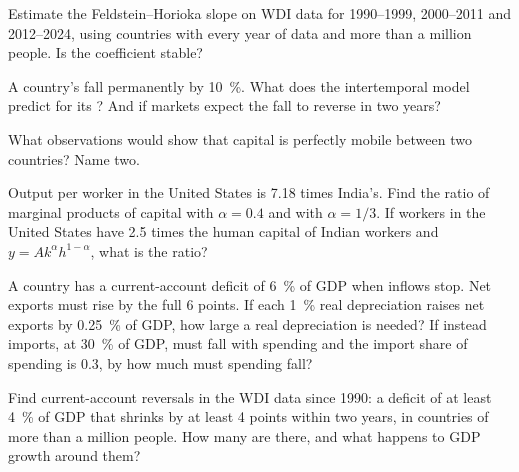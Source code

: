 \begin{exercise}[$\star\star$]\label{exo:b3:current-account:7}
Estimate the Feldstein--Horioka slope on WDI data for 1990--1999, 2000--2011 and
2012--2024, using countries with every year of data and more than a million people.
Is the coefficient stable?
\end{exercise}

\begin{exercise}[$\star\star$]\label{exo:b3:current-account:8}
A country's  fall permanently by 10~\%. What does the intertemporal
model predict for its ? And if markets expect the fall to reverse in
two years?
\end{exercise}

\begin{exercise}[$\star\star$]\label{exo:b3:current-account:9}
What observations would show that capital is perfectly mobile between two
countries? Name two.
\end{exercise}

\begin{exercise}[$\star\star\star$]\label{exo:b3:current-account:10}
Output per worker in the United States is 7.18 times India's. Find the ratio of
marginal products of capital with $\alpha = 0.4$ and with $\alpha = 1/3$. If workers in the
United States have 2.5 times the human capital of Indian workers and $y = Ak^\alpha h^{1-\alpha}$,
what is the ratio?
\end{exercise}

\begin{exercise}[$\star\star\star$]\label{exo:b3:current-account:11}
A country has a current-account deficit of 6~\% of GDP when inflows stop. Net exports
must rise by the full 6 points. If each 1~\% real depreciation raises net exports by
0.25~\% of GDP, how large a real depreciation is needed? If instead imports, at 30~\%
of GDP, must fall with spending and the import share of spending is 0.3, by how much
must spending fall?
\end{exercise}

\begin{exercise}[$\star\star\star$]\label{exo:b3:current-account:12}
Find current-account reversals in the WDI data since 1990: a deficit of at least
4~\% of GDP that shrinks by at least 4 points within two years, in countries of more
than a million people. How many are there, and what happens to GDP growth around
them?
\end{exercise}

